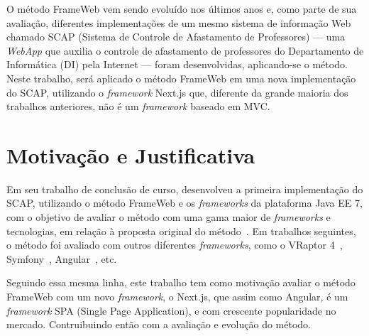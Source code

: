 O método FrameWeb vem sendo evoluído nos últimos anos e, como parte de sua avaliação, diferentes implementações de um mesmo 
sistema de informação Web chamado SCAP (Sistema de Controle de Afastamento de Professores) --- uma \textit{WebApp} que auxilia o 
controle de afastamento de professores do Departamento de Informática (DI) pela Internet --- foram desenvolvidas, aplicando-se o método. 
Neste trabalho, será aplicado o método FrameWeb em uma nova implementação do SCAP,
utilizando o \textit{framework} Next.js que, diferente da grande maioria dos trabalhos anteriores, 
não é um \textit{framework} baseado em MVC.


\section{Motivação e Justificativa}
\label{sec-intro-motjus}

Em seu trabalho de conclusão de curso,  desenvolveu a primeira implementação do SCAP, utilizando o método FrameWeb e os
\textit{frameworks} da plataforma Java EE 7, com o objetivo de avaliar o método com uma gama maior de \textit{frameworks} e tecnologias,
em relação à proposta original do método~\cite{souza:2007}. Em trabalhos seguintes, o método foi
avaliado com outros diferentes \textit{frameworks}, como o VRaptor 4~\cite{prado:2015}, 
Symfony~\cite{berger:2019}, Angular~\cite{gomes:2022}, etc.

Seguindo essa mesma linha, este trabalho tem como motivação avaliar o método FrameWeb com um novo \textit{framework},
o Next.js, que assim como Angular, é um \textit{framework} SPA (Single Page Application), e com crescente popularidade 
no mercado. Contruibuindo então com a avaliação e evolução do método.




